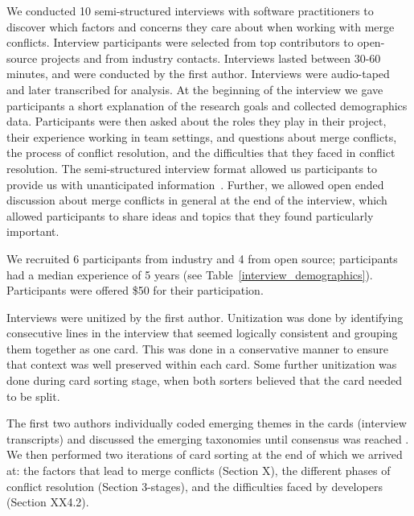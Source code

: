We conducted 10 semi-structured interviews with software practitioners to discover which factors and concerns they care about when working with merge conflicts.
Interview participants were selected from top contributors to open-source projects and from industry contacts.
Interviews lasted between 30-60 minutes, and were conducted by the first author. 
Interviews were audio-taped and later transcribed for analysis. 
At the beginning of the interview we gave participants a short explanation of the research goals and collected demographics data. 
Participants were then asked about the roles they play in their project, their experience working in team settings, and questions about merge conflicts, the process of conflict resolution, and the difficulties that they faced in conflict resolution. 
The semi-structured interview format allowed us participants to provide us with unanticipated information~\cite{seaman2008qualitative}. Further, we allowed open ended discussion about merge conflicts in general at the end of the interview, which allowed participants to share ideas and topics that they found particularly important. 

We recruited 6 participants from industry and 4 from open source; participants had a median experience of 5 years (see Table~\ref{interview_demographics}). Participants were offered \$50 for their participation.  



Interviews were unitized \cite{unitization} by the first author. Unitization was done by identifying consecutive lines in the interview that seemed logically consistent and grouping them together as one card. This was done in a conservative manner to ensure that context was well preserved within each card. Some further unitization was done during card sorting stage, when both sorters believed that the card needed to be split.


The first two authors individually coded emerging themes in the cards (interview transcripts) and discussed the emerging taxonomies until consensus was reached \cite{card_sort}. We then performed two iterations of card sorting at the end of which we arrived at: the factors that lead to merge conflicts (Section X), the different phases of conflict resolution (Section 3-stages), and the difficulties faced by developers (Section XX4.2).

